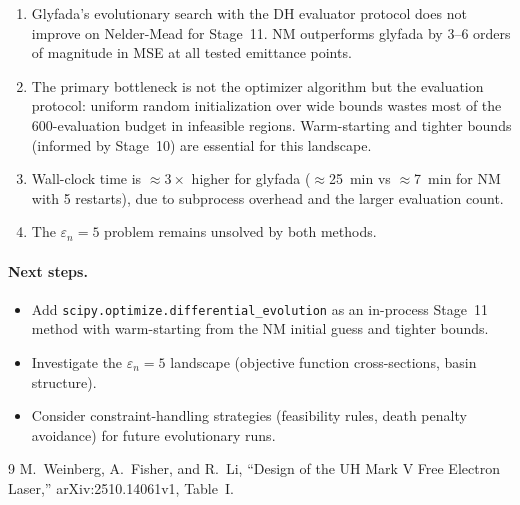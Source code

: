 \documentclass[11pt]{article}
\begin{document}
\begin{enumerate}
  \item Glyfada's evolutionary search with the DH evaluator protocol
    does not improve on Nelder-Mead for Stage~11.  NM outperforms
    glyfada by 3--6 orders of magnitude in MSE at all tested
    emittance points.
  \item The primary bottleneck is not the optimizer algorithm but the
    evaluation protocol: uniform random initialization over wide
    bounds wastes most of the 600-evaluation budget in infeasible
    regions.  Warm-starting and tighter bounds (informed by
    Stage~10) are essential for this landscape.
  \item Wall-clock time is $\approx 3\times$ higher for glyfada
    ($\approx$\SI{25}{min} vs $\approx$\SI{7}{min} for NM with 5
    restarts), due to subprocess overhead and the larger evaluation
    count.
  \item The $\varepsilon_n = 5$ problem remains unsolved by both
    methods.
\end{enumerate}

\paragraph{Next steps.}
\begin{itemize}
  \item Add \texttt{scipy.optimize.differential\_evolution} as an
    in-process Stage~11 method with warm-starting from the NM
    initial guess and tighter bounds.
  \item Investigate the $\varepsilon_n = 5$ landscape (objective
    function cross-sections, basin structure).
  \item Consider constraint-handling strategies (feasibility rules,
    death penalty avoidance) for future evolutionary runs.
\end{itemize}


\begin{thebibliography}{9}
  M.~Weinberg, A.~Fisher, and R.~Li,
  ``Design of the UH Mark V Free Electron Laser,''
  arXiv:2510.14061v1, Table~I.
\end{thebibliography}
\end{document}
